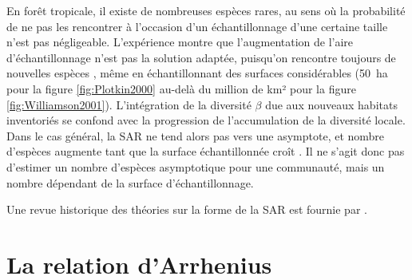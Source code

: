 \documentclass[
  11pt,
  french,
  a4paper,
  extrafontsizes,onecolumn,openright
  ]{memoir}
\newlength{\rf}
\begin{document}
En forêt tropicale, il existe de nombreuses espèces rares, au sens où la probabilité de ne pas les rencontrer à l'occasion d'un échantillonnage d'une certaine taille n'est pas négligeable.
L'expérience montre que l'augmentation de l'aire d'échantillonnage n'est pas la solution adaptée, puisqu'on rencontre toujours de nouvelles espèces \autocite{Gotelli2001}, même en échantillonnant des surfaces considérables (50~ha pour la figure \ref{fig:Plotkin2000} au-delà du million de km² pour la figure \ref{fig:Williamson2001}).
L'intégration de la diversité \(\beta\) due aux nouveaux habitats inventoriés se confond avec la progression de l'accumulation de la diversité locale.
Dans le cas général, la SAR ne tend alors pas vers une asymptote, et nombre d'espèces augmente tant que la surface échantillonnée croît \autocite{Williamson2001}.
Il ne s'agit donc pas d'estimer un nombre d'espèces asymptotique pour une communauté, mais un nombre dépendant de la surface d'échantillonnage.

Une revue historique des théories sur la forme de la SAR est fournie par \textcite{McGuinness1984}.

\section{La relation d'Arrhenius}\label{sec-Arrhenius}



\scriptsize
\end{document}
